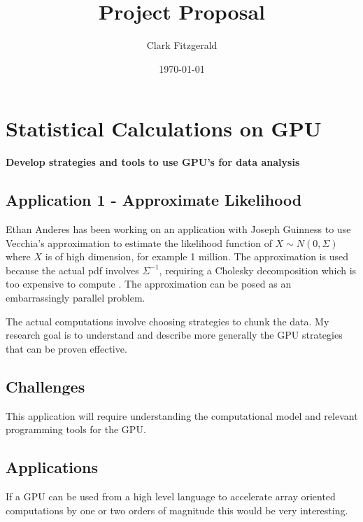 \documentclass[12pt]{article}
\begin{document}
\title{Project Proposal}
\date{\today}
\author{Clark Fitzgerald}
\maketitle

\begin{abstract}

\end{abstract}

\section{Statistical Calculations on GPU}

\textbf{Develop strategies and tools to use GPU's for data analysis}

\subsection{Application 1 - Approximate Likelihood}

Ethan Anderes has been working on an application with Joseph Guinness to
use Vecchia's approximation to estimate the likelihood function of $X \sim
N(0, \Sigma)$ where $X$ is of high dimension, for example 1 million. The
approximation is used because the actual pdf involves $\Sigma^{-1}$,
requiring a Cholesky decomposition which is too expensive to compute
\cite{guinness2016permutation}.  The approximation can be posed as an
embarrassingly parallel problem.

The actual computations involve choosing strategies to chunk the data. 
My research goal is to understand and describe more generally the
GPU strategies that can be proven effective.

\subsection{Challenges}

This application will require understanding the computational model and
relevant programming tools for the GPU.

\subsection{Applications}

If a GPU can be used from a high level language to accelerate array
oriented computations by one or two orders of magnitude this would be very
interesting.
\end{document}
